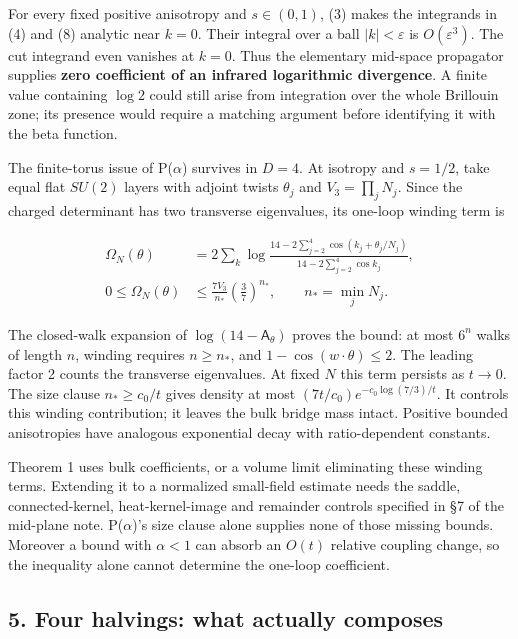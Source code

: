 \documentclass[11pt,a4paper]{article}
\begin{document}
For every fixed positive anisotropy and \(s\in(0,1)\), (3) makes the
integrands in (4) and (8) analytic near \(k=0\). Their integral over a
ball \(|k|<\varepsilon\) is \(O(\varepsilon^3)\). The cut integrand even
vanishes at \(k=0\). Thus the elementary mid-space propagator supplies
\textbf{zero coefficient of an infrared logarithmic divergence}. A
finite value containing \(\log2\) could still arise from integration
over the whole Brillouin zone; its presence would require a matching
argument before identifying it with the beta function.

The finite-torus issue of P(\(\alpha\)) survives in \(D=4\). At isotropy
and \(s=1/2\), take equal flat \(SU(2)\) layers with adjoint twists
\(\theta_j\) and \(V_3=\prod_jN_j\). Since the charged determinant has
two transverse eigenvalues, its one-loop winding term is

\[\begin{aligned}
 \Omega_N(\theta)&=2\sum_k\log
 \frac{14-2\sum_{j=2}^4\cos(k_j+\theta_j/N_j)}
      {14-2\sum_{j=2}^4\cos k_j},\\
 0\le\Omega_N(\theta)&\le\frac{7V_3}{n_*}
           \left(\frac37\right)^{n_*},\qquad n_*=\min_jN_j.
\end{aligned}\tag{11}\]

The closed-walk expansion of \(\log(14-\mathsf A_\theta)\) proves the
bound: at most \(6^n\) walks of length \(n\), winding requires
\(n\ge n_*\), and \(1-\cos(w\cdot\theta)\le2\). The leading factor 2
counts the transverse eigenvalues. At fixed \(N\) this term persists as
\(t\to0\). The size clause \(n_*\ge c_0/t\) gives density at most
\((7t/c_0)e^{-c_0\log(7/3)/t}\). It controls this winding contribution;
it leaves the bulk bridge mass intact. Positive bounded anisotropies
have analogous exponential decay with ratio-dependent constants.

Theorem 1 uses bulk coefficients, or a volume limit eliminating these
winding terms. Extending it to a normalized small-field estimate needs
the saddle, connected-kernel, heat-kernel-image and remainder controls
specified in §7 of the mid-plane note. P(\(\alpha\))'s size clause alone
supplies none of those missing bounds. Moreover a bound with
\(\alpha<1\) can absorb an \(O(t)\) relative coupling change, so the
inequality alone cannot determine the one-loop coefficient.

\hypertarget{four-halvings-what-actually-composes}{%
\subsection{5. Four halvings: what actually
composes}\label{four-halvings-what-actually-composes}}
\end{document}
